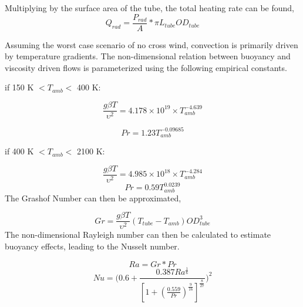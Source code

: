 \documentclass[heading.tex]{subfiles}
\begin{document}
Multiplying by the surface area of the tube, the total heating rate can be found,
\begin{equation*}
Q_{rad} =  \frac{P_{rad}}{A} * \pi L_{tube} OD_{tube}
\end{equation*}

Assuming the worst case scenario of no cross wind, convection is primarily driven by temperature gradients. The non-dimensional relation
between buoyancy and viscosity driven flows is parameterized using the following empirical constants. \cite{Berton} \cite{Incropera}

if 150 K $<  T_{amb} <$ 400 K:


\begin{equation*}
\frac{g \beta T} {\upsilon^2} =  4.178\times10^{19} \times T_{amb}^{-4.639}
\end{equation*}

\begin{equation*}
Pr = 1.23 T_{amb}^{-0.09685}
\end{equation*}

if 400 K $<  T_{amb}  <$ 2100 K:


\begin{equation*}
\frac{g \beta T} {\upsilon^2}  = 4.985\times10^{18} \times T_{amb}^{-4.284}
\end{equation*}
\begin{equation*}
Pr = 0.59 T_{amb}^{0.0239}
\end{equation*}
The Grashof Number can then be approximated,


\begin{equation*}
Gr = \frac{g \beta T} {\upsilon^2}  (T_{tube}-T_{amb}) {OD}_{tube}^3
\end{equation*}
The non-dimensional Rayleigh number can then be calculated to estimate buoyancy effects, leading to the Nusselt number.


\begin{equation*}
Ra = Gr * Pr
\end{equation*}
\begin{equation*}
Nu = \Bigg(0.6 + \frac{0.387Ra^{\frac{1}{6}}}{[1+(\frac{0.559}{Pr})^{\frac{9}{16}}]^{\frac{8}{27}}}\Bigg)^2
\end{equation*}
\end{document}
